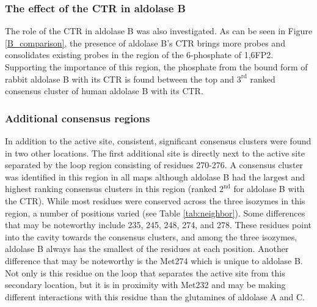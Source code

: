 \documentclass[11pt,a4paper]{article}
\begin{document}
\subsubsection{The effect of the CTR in aldolase B} 
	The role of the CTR in aldolase B was also investigated.  As can be seen in Figure \ref{B_comparison}, the presence of aldolase B's CTR brings more 
	probes and consolidates existing
	probes in the region of the 6-phosphate of 1,6FP2.  Supporting the importance of this region, the phosphate from the bound form of rabbit aldolase B with its CTR is 
	found between the top and $3^\mathrm{rd}$ ranked consensus cluster of human aldolase B with its CTR.  

\subsubsection{Additional consensus regions}
	In addition to the active site, consistent, significant consensus clusters were found in two other locations.  The first additional site is directly next 
	to the active site
	separated by the loop region consisting of residues 270-276.  A consensus cluster was identified in this region in all maps although aldolase B had the largest 
	and highest ranking consensus clusters in this region (ranked $2^\mathrm{nd}$ for aldolase B with the CTR).  
	While most residues were conserved across the three isozymes in this region, a number of positions
	varied (see Table \ref{tab:neighbor}).  Some differences that may be noteworthy include 235, 245, 248, 274, and 278.  These residues
	point into the cavity towards the consensus clusters, and among the three isozymes, aldolase B always has the smallest of the residues at each position.  
	Another difference that may be noteworthy is the Met274 which is unique to aldolase B.  Not only is this residue on the loop that separates the active site from this 
	secondary location, but it is in proximity with Met232 and may be making different interactions with this residue than the glutamines of aldolase A and C.
\end{document}
